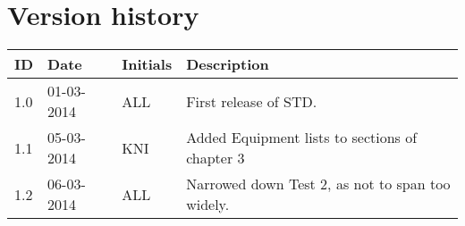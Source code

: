\documentclass[Main]{subfiles}
\begin{document}
\section*{Version history}

\begin{tabular}{p{} p{} p{} p{}}
\hline
\textbf{ID} & \textbf{Date} & \textbf{Initials} & \textbf{Description}
\\
\hline
1.0 & 01-03-2014 & ALL & First release of STD. \\
1.1 & 05-03-2014 & KNI & Added Equipment lists to sections of chapter 3\\
1.2 & 06-03-2014 & ALL & Narrowed down Test 2, as not to span too widely.

\\ \hline 
\end{tabular} 
\end{document}
